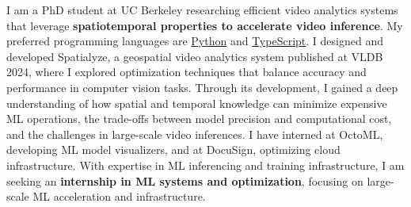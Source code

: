 \cvsummarysection


\begin{cvparagraph}

I am a PhD student at UC Berkeley researching efficient video analytics systems that leverage {\bf spatiotemporal properties to accelerate video inference}.
My preferred programming languages are \underline{Python} and \underline{TypeScript}.
I designed and developed Spatialyze, a geospatial video analytics system published at VLDB 2024, where I explored optimization techniques that balance accuracy and performance in computer vision tasks.
Through its development, I gained a deep understanding of how spatial and temporal knowledge can minimize expensive ML operations, the trade-offs between model precision and computational cost, and the challenges in large-scale video inferences.
I have interned at OctoML, developing ML model visualizers, and at DocuSign, optimizing cloud infrastructure.
With expertise in ML inferencing and training infrastructure, I am seeking an {\bf internship in ML systems and optimization}, focusing on large-scale ML acceleration and infrastructure.
\end{cvparagraph}
\vspace{-1mm}
